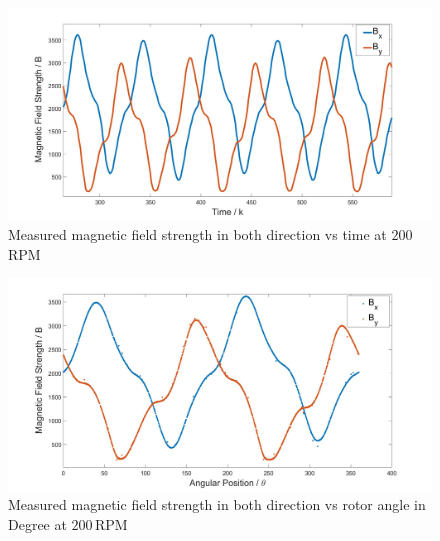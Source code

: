 \documentclass[english]{isasthesis}
\begin{document}
    		\begin{figure}[p!]
    		\begin{center}
    			\includegraphics[width=1\textwidth]{figures/Time_200rpm.jpg}   			
  			\end{center}
    		\caption{Measured magnetic field strength in both direction vs time at $200\,$RPM}
    		\label{fig:magnetic vs time}
    		\end{figure}
    		\begin{figure}[p!]
    		\begin{center}
    			\includegraphics[width=1\textwidth]{figures/Angle_200rpm.jpg}   			
  			\end{center}
    		\caption{Measured magnetic field strength in both direction vs rotor angle in Degree at $200\,$RPM}
    		\label{fig:magnetic vs angle}
    		\end{figure}
\end{document}
